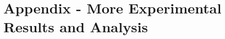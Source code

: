 \documentclass[10pt,twocolumn,letterpaper]{article}
\newcommand{\todo}[1]{\hl{[#1]}}
\begin{document}
\begin{table*}[]
\caption{Comparison of recall performance under various LiDAR configurations  using different algorithms.
}
\label{tab:recall_compare}
\vspace*{-3mm}
\end{table*}



\section{Appendix - More Experimental Results and Analysis}
\label{app:more_ressults}
\end{document}
